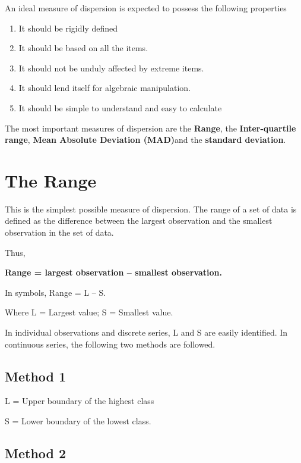 \documentclass[
]{book}
\begin{document}
An ideal measure of dispersion is expected to possess the following
properties

\begin{enumerate}
\def\labelenumi{\arabic{enumi}.}
\item
  It should be rigidly defined
\item
  It should be based on all the items.
\item
  It should not be unduly affected by extreme items.
\item
  It should lend itself for algebraic manipulation.
\item
  It should be simple to understand and easy to calculate
\end{enumerate}

The most important measures of dispersion are the \textbf{Range}, the
\textbf{Inter-quartile range}, \textbf{Mean Absolute Deviation (MAD)}and the \textbf{standard deviation}.

\hypertarget{the-range}{%
\section{The Range}\label{the-range}}

This is the simplest possible measure of dispersion. The range of a set
of data is defined as the difference between the largest observation and
the smallest observation in the set of data.

Thus,

\textbf{Range = largest observation -- smallest observation.}

In symbols, Range = L -- S.

Where L = Largest value; S = Smallest value.

In individual observations and discrete series, L and S are easily
identified. In continuous series, the following two methods are
followed.

\hypertarget{method-1}{%
\subsection{Method 1}\label{method-1}}

L = Upper boundary of the highest class

S = Lower boundary of the lowest class.

\hypertarget{method-2}{%
\subsection{Method 2}\label{method-2}}
\end{document}
